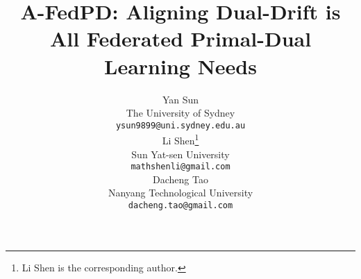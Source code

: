 \documentclass{article}
\title{A-FedPD: Aligning Dual-Drift is All Federated Primal-Dual Learning Needs}
\author{%
  Yan Sun\\
  The University of Sydney\\
  \texttt{ysun9899@uni.sydney.edu.au} \\
  \And
  Li Shen\thanks{Li Shen is the corresponding author.}\\
  Sun Yat-sen University \\
  \texttt{mathshenli@gmail.com} \\
  \And
  Dacheng Tao \\
  Nanyang Technological University \\
  \texttt{dacheng.tao@gmail.com}
}
\begin{document}
\maketitle









%

\newpage
{
\small


}

% 


\end{document}
